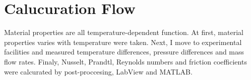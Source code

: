 \documentclass[conference]{IEEEtran}
\begin{document}
\section{Calucuration Flow}
Material properties are all temperature-dependent function.
At first, material properties varies with temperature were taken.
Next, I move to experimental facilities and measured temperature differences, pressure differences and mass flow rates.
Finaly, Nusselt, Prandtl, Reynolds numbers and friction coefficients were calcurated by post-proccesing, LabView and MATLAB. 

%
\end{document}
